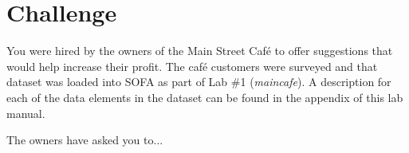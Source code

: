 \section{Challenge}

You were hired by the owners of the Main Street Caf\'{e} to offer suggestions that would help increase their profit. The caf\'{e} customers were surveyed and that dataset was loaded into SOFA as part of Lab \#1 (\textit{maincafe}). A description for each of the data elements in the dataset can be found in the appendix of this lab manual.

The owners have asked you to...
